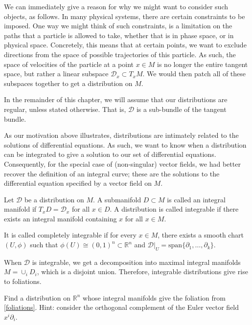 We can immediately give a reason for why we might want to consider such objects, as follows. In many physical systems, there are certain constraints to be imposed. One way we might think of such constraints, is a limitation on the paths that a particle is allowed to take, whether that is in phase space, or in physical space. Concretely, this means that at certain points, we want to exclude directions from the space of possible trajectories of this particle. As such, the space of velocities of the particle at a point $x\in M$ is no longer the entire tangent space, but rather a linear subspace $\mathcal{D}_x\subset T_xM$. We would then patch all of these subspaces together to get a distribution on $M$.
\begin{remark}
  In the remainder of this chapter, we will assume that our distributions are regular, unless stated otherwise. That is, $\mathcal{D}$  is a sub-bundle of the tangent bundle.
\end{remark}
As our motivation above illustrates, distributions are intimately related to the solutions of differential equations. As such, we want to know when a distribution can be integrated to give a solution to our set of differential equations. Consequently, for the special case of (non-singular) vector fields, we had better recover the definition of an integral curve; these are the solutions to the differential equation specified by a vector field on $M$.
\begin{definition}
  Let $\mathcal{D}$ be a distribution on $M$. A submanifold $D\subset M$ is called an integral manifold if $T_xD=\mathcal{D}_x$ for all $x\in D$. A distribution is called integrable if there exists an integral manifold containing $x$ for all $x\in M$. \par
  It is called completely integrable if for every $x\in M$, there exists a smooth chart $(U,\phi)$ such that $\phi(U)\cong (0,1)^n\subset\mathbb{R}^n$ and $\mathcal{D}|_U=\text{span}\{\partial_1,\dots,\partial_k\}$.
\end{definition}
When $\mathcal{D}$ is integrable, we get a decomposition into maximal integral manifolds $M=\cup_i D_i$, which is a disjoint union. Therefore, integrable distributions give rise to foliations.
\begin{exercise}
  Find a distribution on $\mathbb{R}^n$ whose integral manifolds give the foliation from \ref{foliations}. Hint: consider the orthogonal complement of the Euler vector field $x^i\partial_i$.
\end{exercise}

